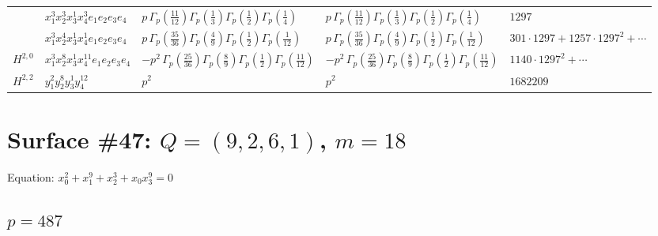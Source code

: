 \documentclass[11pt]{article}
\begin{document}
\begin{table}[ht]
{\begin{tabular}{@{}lllll@{}}
 & $x_{1}^{3} x_{2}^{3} x_{3}^{1} x_{4}^{3}  e_{1} e_{2} e_{3} e_{4}$ & $p \, \Gamma_p \left( \frac{11}{12} \right) \Gamma_p \left( \frac{1}{3} \right) \Gamma_p \left( \frac{1}{2} \right) \Gamma_p \left( \frac{1}{4} \right)$ & $p \, \Gamma_p \left( \frac{11}{12} \right) \Gamma_p \left( \frac{1}{3} \right) \Gamma_p \left( \frac{1}{2} \right) \Gamma_p \left( \frac{1}{4} \right)$ & $1297$ \\
 & $x_{1}^{3} x_{2}^{4} x_{3}^{1} x_{4}^{1}  e_{1} e_{2} e_{3} e_{4}$ & $p \, \Gamma_p \left( \frac{35}{36} \right) \Gamma_p \left( \frac{4}{9} \right) \Gamma_p \left( \frac{1}{2} \right) \Gamma_p \left( \frac{1}{12} \right)$ & $p \, \Gamma_p \left( \frac{35}{36} \right) \Gamma_p \left( \frac{4}{9} \right) \Gamma_p \left( \frac{1}{2} \right) \Gamma_p \left( \frac{1}{12} \right)$ & $301{\cdot}1297{+}1257{\cdot}1297^{2}{+}\cdots$ \\
\midrule
$H^{2,0}$ & $x_{1}^{3} x_{2}^{8} x_{3}^{1} x_{4}^{11}  e_{1} e_{2} e_{3} e_{4}$ & $- p^{2} \, \Gamma_p \left( \frac{25}{36} \right) \Gamma_p \left( \frac{8}{9} \right) \Gamma_p \left( \frac{1}{2} \right) \Gamma_p \left( \frac{11}{12} \right)$ & $- p^{2} \, \Gamma_p \left( \frac{25}{36} \right) \Gamma_p \left( \frac{8}{9} \right) \Gamma_p \left( \frac{1}{2} \right) \Gamma_p \left( \frac{11}{12} \right)$ & $1140{\cdot}1297^{2}{+}\cdots$ \\
\midrule
$H^{2,2}$ & $y_{1}^{2} y_{2}^{8} y_{3}^{1} y_{4}^{12}$ & $p^{2} \,$ & $p^{2} \,$ & $1682209$ \\
\bottomrule
\end{tabular}
}
\renewcommand{\arraystretch}{1.0}
\end{table}

\newpage

\section*{Surface \#47: $Q=(9, 2, 6, 1)$, $m=18$}

Equation: $x_0^{2} + x_1^{9} + x_2^{3} + x_0 x_3^{9} = 0$

\subsection*{$p = 487$}
\end{document}
